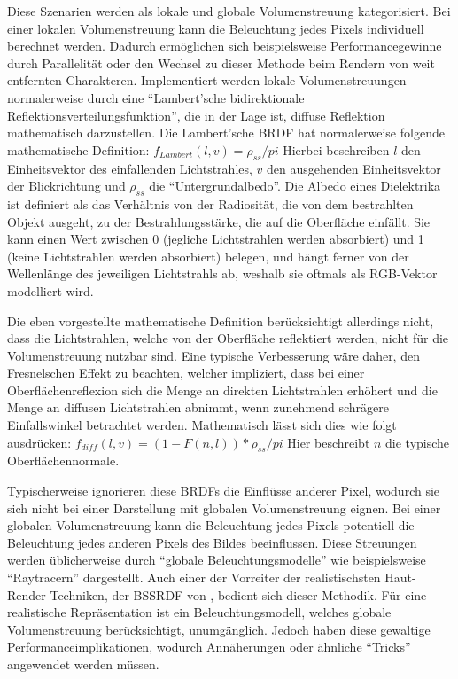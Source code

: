 \documentclass[ngerman,runningheads,a4paper]{llncs}[2018/03/10]
\begin{document}
Diese Szenarien werden als lokale und globale Volumenstreuung kategorisiert.
Bei einer lokalen Volumenstreuung kann die Beleuchtung jedes Pixels individuell berechnet werden.
Dadurch ermöglichen sich beispielsweise Performancegewinne durch Parallelität oder den Wechsel zu dieser Methode beim Rendern von weit entfernten Charakteren.
Implementiert werden lokale Volumenstreuungen normalerweise durch eine \enquote{Lambert'sche  bidirektionale Reflektionsverteilungsfunktion}, die in der Lage ist, diffuse Reflektion mathematisch darzustellen. Die Lambert'sche BRDF hat normalerweise folgende mathematische Definition: $f_{Lambert}(l, v) = \rho_{ss} / pi$ \cite{real-time-rendering}
Hierbei beschreiben $l$ den Einheitsvektor des einfallenden Lichtstrahles, $v$ den ausgehenden Einheitsvektor der Blickrichtung und $\rho_{ss}$ die \enquote{Untergrundalbedo}.
Die Albedo eines Dielektrika ist definiert als das Verhältnis von der Radiosität, die von dem bestrahlten Objekt ausgeht, zu der Bestrahlungsstärke, die auf die Oberfläche einfällt.
Sie kann einen Wert zwischen 0 (jegliche Lichtstrahlen werden absorbiert) und 1 (keine Lichtstrahlen werden absorbiert) belegen, und hängt ferner von der Wellenlänge des jeweiligen Lichtstrahls ab, weshalb sie oftmals als RGB-Vektor modelliert wird.\cite{real-time-rendering}

Die eben vorgestellte mathematische Definition berücksichtigt allerdings nicht, dass die Lichtstrahlen, welche von der Oberfläche reflektiert werden, nicht für die Volumenstreuung nutzbar sind.
Eine typische Verbesserung wäre daher, den Fresnelschen Effekt zu beachten, welcher impliziert, dass bei einer Oberflächenreflexion sich die Menge an direkten Lichtstrahlen erhöhert und die Menge an diffusen Lichtstrahlen abnimmt, wenn zunehmend schrägere Einfallswinkel betrachtet werden.
Mathematisch lässt sich dies wie folgt ausdrücken:
$f_{diff}(l, v) = (1 - F(n, l)) * \rho_{ss} / pi$ \cite{real-time-rendering}
Hier beschreibt $n$ die typische Oberflächennormale.

Typischerweise ignorieren diese BRDFs die Einflüsse anderer Pixel, wodurch sie sich nicht bei einer Darstellung mit globalen Volumenstreuung eignen.
Bei einer globalen Volumenstreuung kann die Beleuchtung jedes Pixels potentiell die Beleuchtung jedes anderen Pixels des Bildes beeinflussen.
Diese Streuungen werden üblicherweise durch \enquote{globale Beleuchtungsmodelle} wie beispielsweise \enquote{Raytracern} dargestellt.
Auch einer der Vorreiter der realistischsten Haut-Render-Techniken, der BSSRDF von \citet{spectral-bssrdf-human-skin}, bedient sich dieser Methodik.
Für eine realistische Repräsentation ist ein Beleuchtungsmodell, welches globale Volumenstreuung berücksichtigt, unumgänglich.
Jedoch haben diese gewaltige Performanceimplikationen, wodurch Annäherungen oder ähnliche \enquote{Tricks} angewendet werden müssen.
\end{document}
